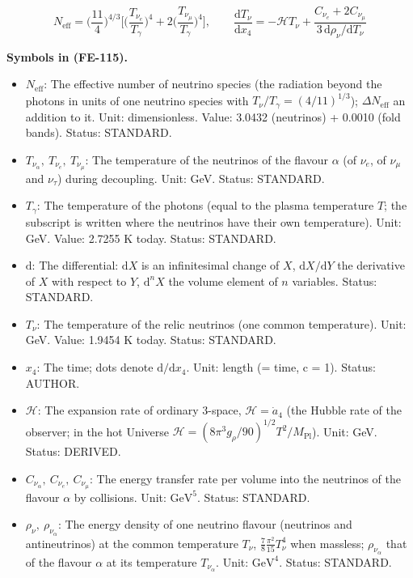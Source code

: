\documentclass[
  10pt,
]{article}
\providecommand{\tightlist}{%
  \setlength{\itemsep}{0pt}\setlength{\parskip}{0pt}}
\begin{document}
\[
N_{\mathrm{eff}} = \Big(\frac{11}{4}\Big)^{4/3}\Big[\Big(\frac{T_{\nu_e}}{T_\gamma}\Big)^4 +
 2\Big(\frac{T_{\nu_\mu}}{T_\gamma}\Big)^4\Big],
\qquad \frac{\mathrm{d}T_\nu}{\mathrm{d}x_4} = -\mathcal{H}T_\nu + \frac{C_{\nu_e} +
 2C_{\nu_\mu}}{3\,\mathrm{d}\rho_\nu/\mathrm{d}T_\nu} \tag{FE-115}
\]

\textbf{Symbols in (FE-115).}

\begin{itemize}
\tightlist
\item
  \(N_{\mathrm{eff}}\): The effective number of neutrino species (the
  radiation beyond the photons in units of one neutrino species with
  \(T_\nu/T_\gamma = (4/11)^{1/3}\)); \(\Delta N_{\mathrm{eff}}\) an
  addition to it. Unit: dimensionless. Value: 3.0432 (neutrinos) +
  0.0010 (fold bands). Status: STANDARD.
\item
  \(T_{\nu_\alpha},\ T_{\nu_e},\ T_{\nu_\mu}\): The temperature of the
  neutrinos of the flavour \(\alpha\) (of \(\nu_e\), of \(\nu_\mu\) and
  \(\nu_\tau\)) during decoupling. Unit: GeV. Status: STANDARD.
\item
  \(T_\gamma\): The temperature of the photons (equal to the plasma
  temperature \(T\); the subscript is written where the neutrinos have
  their own temperature). Unit: GeV. Value: 2.7255 K today. Status:
  STANDARD.
\item
  \(\mathrm{d}\): The differential: \(\mathrm{d}X\) is an infinitesimal
  change of \(X\), \(\mathrm{d}X/\mathrm{d}Y\) the derivative of \(X\)
  with respect to \(Y\), \(\mathrm{d}^nX\) the volume element of \(n\)
  variables. Status: STANDARD.
\item
  \(T_\nu\): The temperature of the relic neutrinos (one common
  temperature). Unit: GeV. Value: 1.9454 K today. Status: STANDARD.
\item
  \(x_4\): The time; dots denote \(\mathrm{d}/\mathrm{d}x_4\). Unit:
  length (= time, c = 1). Status: AUTHOR.
\item
  \(\mathcal{H}\): The expansion rate of ordinary 3-space,
  \(\mathcal{H} = \dot a_4\) (the Hubble rate of the observer; in the
  hot Universe
  \(\mathcal{H} = (8\pi^3g_\rho/90)^{1/2}T^2/M_{\mathrm{Pl}}\)). Unit:
  GeV. Status: DERIVED.
\item
  \(C_{\nu_\alpha},\ C_{\nu_e},\ C_{\nu_\mu}\): The energy transfer rate
  per volume into the neutrinos of the flavour \(\alpha\) by collisions.
  Unit: \(\mathrm{GeV}^{5}\). Status: STANDARD.
\item
  \(\rho_\nu,\ \rho_{\nu_\alpha}\): The energy density of one neutrino
  flavour (neutrinos and antineutrinos) at the common temperature
  \(T_\nu\), \(\frac78\frac{\pi^2}{15}T_\nu^4\) when massless;
  \(\rho_{\nu_\alpha}\) that of the flavour \(\alpha\) at its
  temperature \(T_{\nu_\alpha}\). Unit: \(\mathrm{GeV}^{4}\). Status:
  STANDARD.
\end{itemize}
\end{document}
